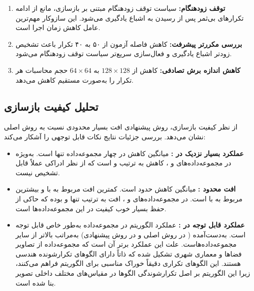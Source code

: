 \begin{enumerate}
\item \textbf{توقف زودهنگام:} سیاست توقف زودهنگام مبتنی بر  بازسازی، مانع از ادامه تکرارهای بی‌ثمر پس از رسیدن به اشباع یادگیری می‌شود. این سازوکار مهم‌ترین عامل کاهش زمان اجرا است.
\item \textbf{بررسی مکرر‌تر پیشرفت:} کاهش فاصله آزمون از ۵۰ به ۴۰ تکرار باعث تشخیص زودتر اشباع یادگیری و فعال‌سازی سریع‌تر سیاست توقف زودهنگام می‌شود.
\item \textbf{کاهش اندازه برش تصادفی:} کاهش  از $128 \times 128$ به $64 \times 64$ حجم محاسبات هر تکرار را به‌صورت مستقیم کاهش می‌دهد.
\end{enumerate}

\subsection{تحلیل کیفیت بازسازی}

از نظر کیفیت بازسازی، روش پیشنهادی افت بسیار محدودی نسبت به روش اصلی نشان می‌دهد. بررسی جزئیات نتایج نکات قابل توجهی را آشکار می‌کند:

\begin{itemize}
\item \textbf{عملکرد بسیار نزدیک در :} میانگین کاهش  در چهار مجموعه‌داده تنها  است. به‌ویژه در مجموعه‌داده‌های  و ، کاهش  به ترتیب  و  است که از نظر ادراکی عملاً قابل تشخیص نیست.

\item \textbf{افت محدود :} میانگین کاهش  حدود  است. کمترین افت مربوط به  با  و بیشترین مربوط به  با  است. در مجموعه‌داده‌های  و ، افت  به ترتیب تنها  و  بوده که حاکی از حفظ بسیار خوب کیفیت در این مجموعه‌داده‌ها است.

\item \textbf{عملکرد قابل توجه در :} عملکرد الگوریتم  در مجموعه‌داده  به‌طور خاص قابل توجه است.  به‌دست‌آمده ( در روش اصلی و  در روش پیشنهادی) به‌مراتب بالاتر از سایر مجموعه‌داده‌هاست. علت این عملکرد برتر آن است که مجموعه‌داده  از تصاویر فضاها و معماری شهری تشکیل شده که ذاتاً دارای الگوهای تکرارشونده هندسی هستند. این الگوهای تکراری دقیقاً خوراک مناسبی برای الگوریتم  فراهم می‌کنند، زیرا این الگوریتم بر اصل تکرارشوندگی الگوها در مقیاس‌های مختلف داخلی تصویر بنا شده است.
\end{itemize}

